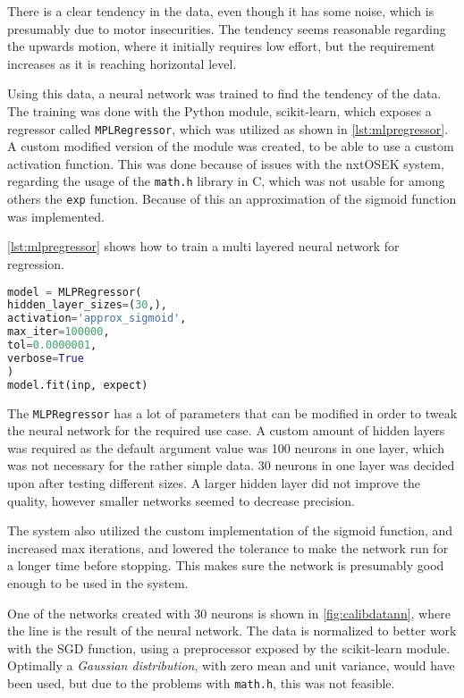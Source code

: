 
There is a clear tendency in the data, even though it has some noise, which is presumably due to motor insecurities.
The tendency seems reasonable regarding the upwards motion, where it initially requires low effort, but the requirement increases as it is reaching horizontal level.

Using this data, a neural network was trained to find the tendency of the data.
The training was done with the Python module, scikit-learn\cite{scikit-learn}, which exposes a regressor called \texttt{MPLRegressor}, which was utilized as shown in \autoref{lst:mlpregressor}.
A custom modified version of the module was created, to be able to use a custom activation function.
This was done because of issues with the nxtOSEK system, regarding the usage of the \texttt{math.h} library in C, which was not usable for among others the \texttt{exp} function.
Because of this an approximation of the sigmoid function was implemented.

\autoref{lst:mlpregressor} shows how to train a multi layered neural network for regression.

\begin{lstlisting}[language=python,label={lst:mlpregressor},caption={Training a MLPRegressor with scikit}]
model = MLPRegressor(
hidden_layer_sizes=(30,),
activation='approx_sigmoid',
max_iter=100000,
tol=0.0000001,
verbose=True
)
model.fit(inp, expect)

\end{lstlisting}

The \texttt{MLPRegressor} has a lot of parameters that can be modified in order to tweak the neural network for the required use case.
A custom amount of hidden layers was required as the default argument value was 100 neurons in one layer, which was not necessary for the rather simple data.
30 neurons in one layer was decided upon after testing different sizes.
A larger hidden layer did not improve the quality, however smaller networks seemed to decrease precision.

The system also utilized the custom implementation of the sigmoid function, and increased max iterations, and lowered the tolerance to make the network run for a longer time before stopping.
This makes sure the network is presumably good enough to be used in the system.

One of the networks created with 30 neurons is shown in \autoref{fig:calibdatann}, where the line is the result of the neural network.
The data is normalized to better work with the SGD function, using a preprocessor exposed by the scikit-learn module.
Optimally a \textit{Gaussian distribution}, with zero mean and unit variance, would have been used, but due to the problems with \texttt{math.h}, this was not feasible.

